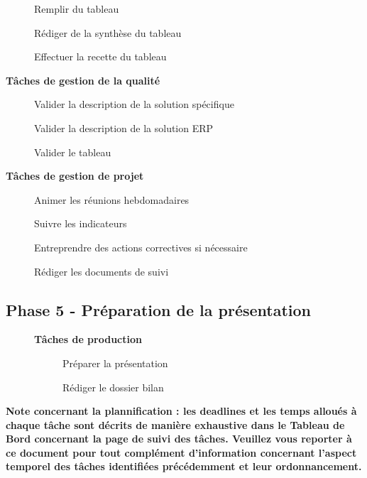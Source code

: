 \begin{description}
\begin{description}
\begin{description}
\begin{description}
                            \item[\textbullet] Remplir du tableau
                            \item[\textbullet] Rédiger de la synthèse du tableau
                            \item[\textbullet] Effectuer la recette du tableau
                        \end{description}
                \end{description}
        \end{description}
    \item[] \bf{Tâches de gestion de la qualité}
        \begin{description}
            \item[\textbullet] Valider la description de la solution spécifique
            \item[\textbullet] Valider la description de la solution ERP
            \item[\textbullet] Valider le tableau
        \end{description}
    \item[] \bf{Tâches de gestion de projet}
        \begin{description}
            \item[\textbullet] Animer les réunions hebdomadaires
            \item[\textbullet] Suivre les indicateurs
            \item[\textbullet] Entreprendre des actions correctives si nécessaire 
            \item[\textbullet] Rédiger les documents de suivi
        \end{description}
\end{description}

\subsection{Phase 5 - Préparation de la présentation}

\begin{description}
    \item[] \bf{Tâches de production}
        \begin{description}
            \item[\textbullet] Préparer la présentation
            \item[\textbullet] Rédiger le dossier bilan
        \end{description}
\end{description}

\bf{Note concernant la plannification :} les deadlines et les temps alloués à chaque tâche sont décrits de manière exhaustive dans le Tableau de Bord concernant la page de suivi des tâches. Veuillez vous reporter à ce document pour tout complément d’information concernant l’aspect temporel des tâches identifiées précédemment et leur ordonnancement.
